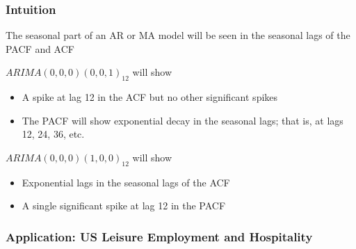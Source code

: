 \documentclass{beamer}
\begin{document}
\begin{frame}
  \frametitle{Intuition}

  The seasonal part of an AR or MA model will be seen in the seasonal lags of the PACF and ACF


  \begin{exampleblock}{$ARIMA(0,0,0)(0,0,1)_{12}$  will show}

    \begin{itemize}
    \item A spike at lag 12 in the ACF but no other significant spikes
    \item The PACF will show exponential decay in the seasonal lags; that is, at lags 12, 24, 36, etc.
    \end{itemize}
    
  \end{exampleblock}
  
\medskip

  \begin{exampleblock}{$ARIMA(0,0,0)(1,0,0)_{12}$  will show}

    \begin{itemize}
    \item Exponential lags in the seasonal lags of the ACF
    \item A single significant spike at lag 12 in the PACF
    \end{itemize}
    
  \end{exampleblock}

\end{frame}


\begin{frame}
  \frametitle{Application:  US Leisure Employment and Hospitality}
\end{frame}
\end{document}
